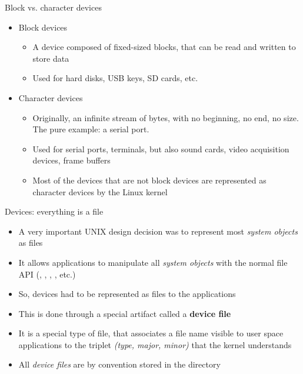 \begin{frame}{Block vs. character devices}
  \begin{itemize}
  \item Block devices
    \begin{itemize}
    \item A device composed of fixed-sized blocks, that can be read
      and written to store data
    \item Used for hard disks, USB keys, SD cards, etc.
    \end{itemize}
  \item Character devices
    \begin{itemize}
    \item Originally, an infinite stream of bytes, with no beginning,
      no end, no size. The pure example: a serial port.
    \item Used for serial ports, terminals, but also sound cards,
      video acquisition devices, frame buffers
    \item Most of the devices that are not block devices are
      represented as character devices by the Linux kernel
    \end{itemize}
  \end{itemize}
\end{frame}

\begin{frame}{Devices: everything is a file}
  \begin{itemize}
  \item A very important UNIX design decision was to represent most
    {\em system objects} as files
  \item It allows applications to manipulate all {\em system objects} with
    the normal file API (, , ,
    , etc.)
  \item So, devices had to be represented as files to the applications
  \item This is done through a special artifact called a {\bf device
      file}
  \item It is a special type of file, that associates a file name
    visible to user space applications to the triplet {\em (type,
      major, minor)} that the kernel understands
  \item All {\em device files} are by convention stored in the
     directory
  \end{itemize}
\end{frame}

